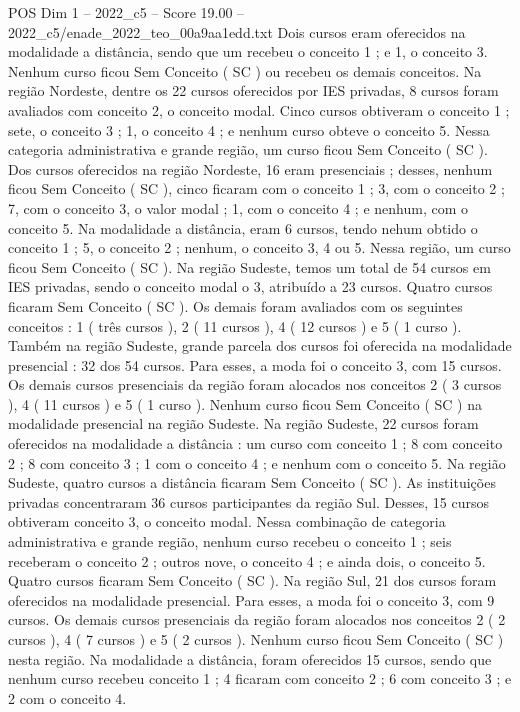 \begin{textsample}{POS Dim 1 – 2022\_c5 – Score 19.00 – 2022\_c5/enade\_2022\_teo\_00a9aa1edd.txt}
Dois cursos eram oferecidos na modalidade a distância, sendo que um recebeu o conceito 1 ; e 1, o conceito 3.
Nenhum curso ficou Sem Conceito ( SC ) ou recebeu os demais conceitos.
Na região Nordeste, dentre os 22 cursos oferecidos por IES privadas, 8 cursos foram avaliados com conceito 2, o conceito modal.
Cinco cursos obtiveram o conceito 1 ; sete, o conceito 3 ; 1, o conceito 4 ; e nenhum curso obteve o conceito 5.
Nessa categoria administrativa e grande região, um curso ficou Sem Conceito ( SC ).
Dos cursos oferecidos na região Nordeste, 16 eram presenciais ; desses, nenhum ficou Sem Conceito ( SC ), cinco ficaram com o conceito 1 ; 3, com o conceito 2 ; 7, com o conceito 3, o valor modal ; 1, com o conceito 4 ; e nenhum, com o conceito 5.
Na modalidade a distância, eram 6 cursos, tendo nehum obtido o conceito 1 ; 5, o conceito 2 ; nenhum, o conceito 3, 4 ou 5.
Nessa região, um curso ficou Sem Conceito ( SC ).
Na região Sudeste, temos um total de 54 cursos em IES privadas, sendo o conceito modal o 3, atribuído a 23 cursos.
Quatro cursos ficaram Sem Conceito ( SC ).
Os demais foram avaliados com os seguintes conceitos : 1 ( três cursos ), 2 ( 11 cursos ), 4 ( 12 cursos ) e 5 ( 1 curso ).
Também na região Sudeste, grande parcela dos cursos foi oferecida na modalidade presencial : 32 dos 54 cursos.
Para esses, a moda foi o conceito 3, com 15 cursos.
Os demais cursos presenciais da região foram alocados nos conceitos 2 ( 3 cursos ), 4 ( 11 cursos ) e 5 ( 1 curso ).
Nenhum curso ficou Sem Conceito ( SC ) na modalidade presencial na região Sudeste.
Na região Sudeste, 22 cursos foram oferecidos na modalidade a distância : um curso com conceito 1 ; 8 com conceito 2 ; 8 com conceito 3 ; 1 com o conceito 4 ; e nenhum com o conceito 5.
Na região Sudeste, quatro cursos a distância ficaram Sem Conceito ( SC ).
As instituições privadas concentraram 36 cursos participantes da região Sul.
Desses, 15 cursos obtiveram conceito 3, o conceito modal.
Nessa combinação de categoria administrativa e grande região, nenhum curso recebeu o conceito 1 ; seis receberam o conceito 2 ; outros nove, o conceito 4 ; e ainda dois, o conceito 5.
Quatro cursos ficaram Sem Conceito ( SC ).
Na região Sul, 21 dos cursos foram oferecidos na modalidade presencial.
Para esses, a moda foi o conceito 3, com 9 cursos.
Os demais cursos presenciais da região foram alocados nos conceitos 2 ( 2 cursos ), 4 ( 7 cursos ) e 5 ( 2 cursos ).
Nenhum curso ficou Sem Conceito ( SC ) nesta região.
Na modalidade a distância, foram oferecidos 15 cursos, sendo que nenhum curso recebeu conceito 1 ; 4 ficaram com conceito 2 ; 6 com conceito 3 ; e 2 com o conceito 4.

\end{textsample}
